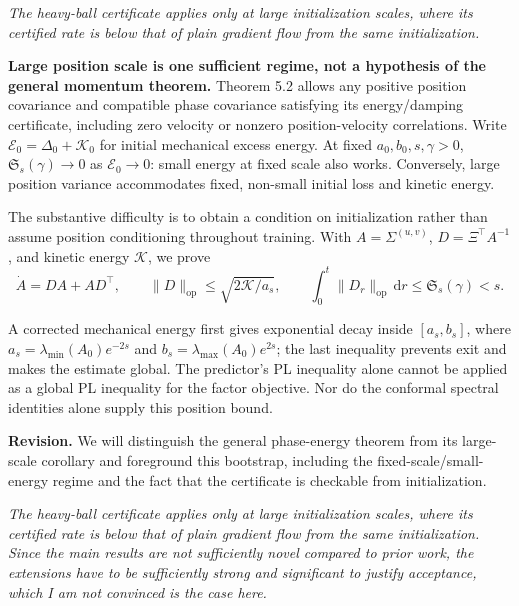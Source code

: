 \documentclass[11pt,a4paper]{article}
\renewenvironment{quote}
  {\par\addvspace{0.8em}\Needspace{8\baselineskip}%
    \list{}{\leftmargin=1.2em\rightmargin=0pt\topsep=0.25em
    \parsep=0.3em}\item\relax\normalsize\itshape\color{quotegray}}
  {\endlist\nopagebreak[4]}
\begin{document}
\begin{quote}
The heavy-ball certificate applies only at large initialization scales, where its certified rate is below that of plain gradient flow from the same initialization.
\end{quote}

\textbf{Large position scale is one sufficient regime, not a hypothesis of the general momentum theorem.} Theorem 5.2 allows any positive position covariance and compatible phase covariance satisfying its energy/damping certificate, including zero velocity or nonzero position-velocity correlations. Write \(\mathcal E_0=\Delta_0+\mathcal K_0\) for initial mechanical excess energy. At fixed \(a_0,b_0,s,\gamma>0\), \(\mathfrak S_s(\gamma)\to0\) as \(\mathcal E_0\to0\): small energy at fixed scale also works. Conversely, large position variance accommodates fixed, non-small initial loss and kinetic energy.

The substantive difficulty is to obtain a condition on initialization rather than assume position conditioning throughout training. With \(A=\Sigma^{(u,v)}\), \(D=\Xi^\top A^{-1}\), and kinetic energy \(\mathcal K\), we prove
\[
\dot A=DA+AD^\top,\qquad
\|D\|_{\mathrm{op}}\le\sqrt{2\mathcal K/a_s},\qquad
\int_0^t\|D_r\|_{\mathrm{op}}\,\mathrm dr\le\mathfrak S_s(\gamma)<s.
\]

A corrected mechanical energy first gives exponential decay inside \([a_s,b_s]\), where \(a_s=\lambda_{\min}(A_0)e^{-2s}\) and \(b_s=\lambda_{\max}(A_0)e^{2s}\); the last inequality prevents exit and makes the estimate global. The predictor's PL inequality alone cannot be applied as a global PL inequality for the factor objective. Nor do the conformal spectral identities alone supply this position bound.

\textbf{Revision.} We will distinguish the general phase-energy theorem from its large-scale corollary and foreground this bootstrap, including the fixed-scale/small-energy regime and the fact that the certificate is checkable from initialization.

\begin{quote}
The heavy-ball certificate applies only at large initialization scales, where its certified rate is below that of plain gradient flow from the same initialization. Since the main results are not sufficiently novel compared to prior work, the extensions have to be sufficiently strong and significant to justify acceptance, which I am not convinced is the case here.
\end{quote}
\end{document}

